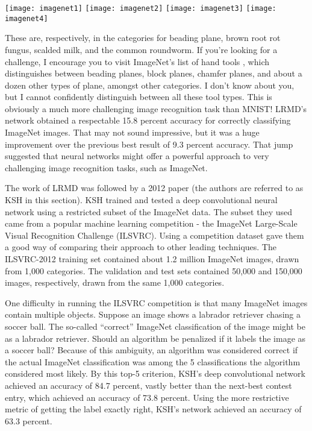 \begin{figure*}[tph]
\texttt{[image: imagenet1]}
\texttt{[image: imagenet2]}
\texttt{[image: imagenet3]}
\texttt{[image: imagenet4]}
\end{figure*}

These are, respectively, in the categories for beading plane, brown root rot fungus, scalded milk, and the common roundworm. If you're looking for a challenge, I encourage you to visit ImageNet's list of hand tools \cite{imagenethandtools2019}, which distinguishes between beading planes, block planes, chamfer planes, and about a dozen other types of plane, amongst other categories. I don't know about you, but I cannot confidently distinguish between all these tool types. This is obviously a much more challenging image recognition task than MNIST! LRMD's network obtained a respectable 15.8 percent accuracy for correctly classifying ImageNet images. That may not sound impressive, but it was a huge improvement over the previous best result of 9.3 percent accuracy. That jump suggested that neural networks might offer a powerful approach to very challenging image recognition tasks, such as ImageNet.

 The work of LRMD was followed by a 2012 paper \cite{Krizhevsky2012} (the authors are referred to as KSH in this section). KSH trained and tested a deep convolutional neural network using a restricted subset of the ImageNet data. The subset they used came from a popular machine learning competition - the ImageNet Large-Scale Visual Recognition Challenge (ILSVRC). Using a competition dataset gave them a good way of comparing their approach to other leading techniques. The ILSVRC-2012 training set contained about 1.2 million ImageNet images, drawn from 1,000 categories. The validation and test sets contained 50,000 and 150,000 images, respectively, drawn from the same 1,000 categories.

One difficulty in running the ILSVRC competition is that many ImageNet images contain multiple objects. Suppose an image shows a labrador retriever chasing a soccer ball. The so-called ``correct'' ImageNet classification of the image might be as a labrador retriever. Should an algorithm be penalized if it labels the image as a soccer ball? Because of this ambiguity, an algorithm was considered correct if the actual ImageNet classification was among the 5 classifications the algorithm considered most likely. By this top-5 criterion, KSH's deep convolutional network achieved an accuracy of 84.7 percent, vastly better than the next-best contest entry, which achieved an accuracy of 73.8 percent. Using the more restrictive metric of getting the label exactly right, KSH's network achieved an accuracy of 63.3 percent.

